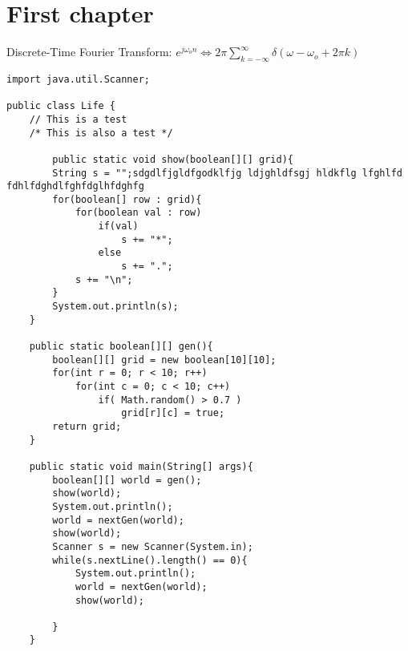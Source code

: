 \chapter{First chapter}
Discrete-Time Fourier Transform: 
$e^{j\omega _o n} \Leftrightarrow 2\pi \sum\limits_{k = - \infty }^\infty {\delta (\omega - \omega _o + 2\pi k)}$

\begin{lstlisting}
import java.util.Scanner;

public class Life {
    // This is a test
    /* This is also a test */
    
		public static void show(boolean[][] grid){
        String s = "";sdgdlfjgldfgodklfjg ldjghldfsgj hldkflg lfghlfd fdhlfdghdlfghfdglhfdghfg
        for(boolean[] row : grid){
            for(boolean val : row)
                if(val)
                    s += "*";
                else
                    s += ".";
            s += "\n";
        }
        System.out.println(s);
    }
    
    public static boolean[][] gen(){
        boolean[][] grid = new boolean[10][10];
        for(int r = 0; r < 10; r++)
            for(int c = 0; c < 10; c++)
                if( Math.random() > 0.7 )
                    grid[r][c] = true;
        return grid;
    }
    
    public static void main(String[] args){
        boolean[][] world = gen();
        show(world);
        System.out.println();
        world = nextGen(world);
        show(world);
        Scanner s = new Scanner(System.in);
        while(s.nextLine().length() == 0){
            System.out.println();
            world = nextGen(world);
            show(world);
            
        }
    }
    
\end{lstlisting}